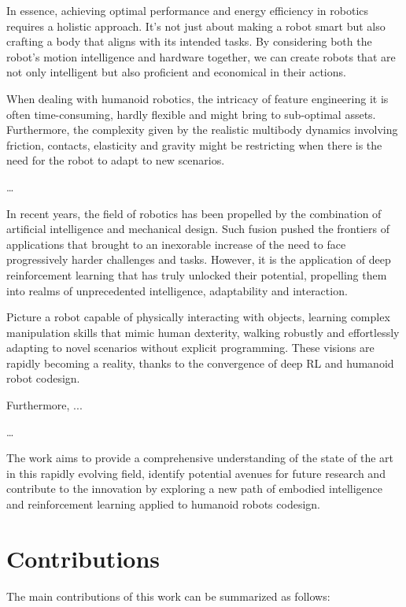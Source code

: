 In essence, achieving optimal performance and energy efficiency in robotics requires a holistic approach. It's not just about making a robot smart but also crafting a body that aligns with its intended tasks. By considering both the robot's motion intelligence and hardware together, we can create robots that are not only intelligent but also proficient and economical in their actions.

When dealing with humanoid robotics, the intricacy of feature engineering it is often time-consuming, hardly flexible and might bring to sub-optimal assets. Furthermore, the complexity given by the realistic multibody dynamics involving friction, contacts, elasticity and gravity might be restricting when there is the need for the robot to adapt to new scenarios.

\dots

In recent years, the field of robotics has been propelled by the combination of artificial intelligence and mechanical design. Such fusion pushed the frontiers of applications that brought to an inexorable increase of the need to face progressively harder challenges and tasks. However, it is the application of deep reinforcement learning that has truly unlocked their potential, propelling them into realms of unprecedented intelligence, adaptability and interaction.

Picture a robot capable of physically interacting with objects, learning complex manipulation skills that mimic human dexterity, walking robustly and effortlessly adapting to novel scenarios without explicit programming. These visions are rapidly becoming a reality, thanks to the convergence of deep \ac{RL} and humanoid robot codesign.

Furthermore, ...

\dots

The work aims to provide a comprehensive understanding of the state of the art in this rapidly evolving field, identify potential avenues for future research and contribute to the innovation by exploring a new path of embodied intelligence and reinforcement learning applied to humanoid robots codesign.

\section*{Contributions}

The main contributions of this work can be summarized as follows:

